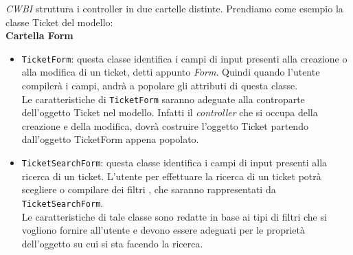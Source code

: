 \noindent
\textit{CWBI} struttura i controller in due cartelle distinte. Prendiamo come esempio la classe Ticket del modello:\\

\textbf{Cartella Form}
\begin{itemize}
\item \texttt{TicketForm}: questa classe identifica i campi di input presenti alla creazione o alla modifica di un ticket, detti appunto \textit{Form}. Quindi quando l'utente compilerà i campi, andrà a popolare gli attributi di questa classe. \\ Le caratteristiche di \texttt{TicketForm} saranno adeguate alla controparte dell'oggetto Ticket nel modello. Infatti il \textit{controller} che si occupa della creazione e della modifica, dovrà costruire l'oggetto Ticket partendo dall'oggetto TicketForm appena popolato. 

\item \texttt{TicketSearchForm}: questa classe identifica i campi di input presenti alla ricerca di un ticket. L'utente per effettuare la ricerca di un ticket potrà scegliere o compilare dei filtri , che saranno rappresentati da \texttt{TicketSearchForm}. \\
Le caratteristiche di tale classe sono redatte in base ai tipi di filtri che si vogliono fornire all'utente e devono essere adeguati per le proprietà dell'oggetto su cui si sta facendo la ricerca.

\end{itemize}
\medskip

